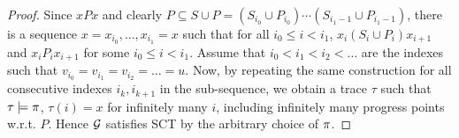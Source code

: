 \begin{proof}
Since $x P x$ and clearly $P \subseteq S \cup P = (S_{i_0} \cup P_{i_0}) \cdots (S_{i_1-1} \cup P_{i_1-1})$, there is a sequence $x = x_{i_0}, \ldots , x_{i_1} =x$ such that for all $i_{0} \leq i < i_1$, $x_i(S_{i} \cup P_{i}) x_{i+1}$ %
and $x_i P_{i} x_{i+1}$ for some $i_{0} \leq i < i_1$.
Assume that $i_0 < i_1 < i_2 < \ldots$ are the indexes such that 
$v_{i_0} = v_{i_1} = v_{i_2} = \ldots = u$.
Now, by repeating the same construction for all consecutive indexes $i_k, i_{k+1}$ in the
sub-sequence, 
 we obtain a trace $\tau$ such that $\tau \models \pi$, $\tau(i) = x$ for infinitely many $i$, 
 including infinitely many progress points w.r.t. $P$. 
 Hence $\mathcal{G}$ satisfies SCT by the arbitrary choice of $\pi$.
\end{proof}



